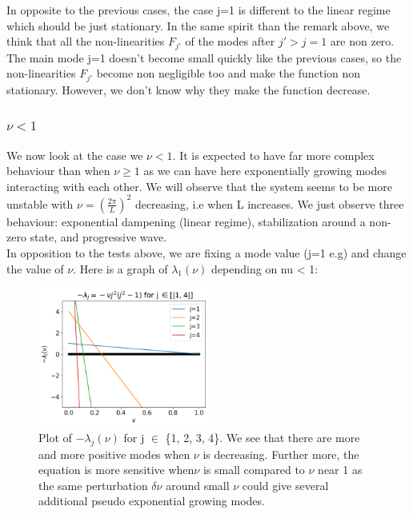 \documentclass[12pt]{article}
\begin{document}
In opposite to the previous cases, the case j=1 is different to the linear regime which should be just stationary. In the same spirit than the remark above, we think that all the non-linearities $F_{j'}$ of the modes after $j'>j=1$ are non zero. The main mode j=1 doesn't become small quickly like the previous cases, so the non-linearities $F_{j'}$ become non negligible too and make the function non stationary. However, we don't know why they make the function decrease.

\subsubsection{\texorpdfstring{$\nu <1$}{nu < 1}}
We now look at the case we $\nu <1$. It is expected to have far more complex behaviour than when $\nu \geq 1$ as we can have here exponentially growing modes interacting with each other. We will observe that the system seems to be more unstable with $\nu = (\frac{2\pi}{L})^2$ decreasing, i.e when L increases. 
We just observe three behaviour: exponential dampening (linear regime), stabilization around a non-zero state, and progressive wave.
\\

In opposition to the tests above, we are fixing a mode value (j=1 e.g) and change the value of $\nu$. Here is a graph of $\lambda_1(\nu)$ depending on nu < 1: 

\begin{figure}[h]
\centering
\includegraphics[width=0.5\textwidth]{KS_eq/plot_lambda_nu.png}
\caption{Plot of $-\lambda_j(\nu)$ for j $\in$ \{1, 2, 3, 4\}. We see that there are more and more positive modes when $\nu$ is decreasing. Further more, the equation is more sensitive when$\nu$  is small compared to $\nu$ near 1 as the same perturbation $\delta \nu$ around small $\nu$ could give several additional pseudo exponential growing modes.   }
\label{fig:KS_eq_nu_inf_1}
\end{figure}
\end{document}
